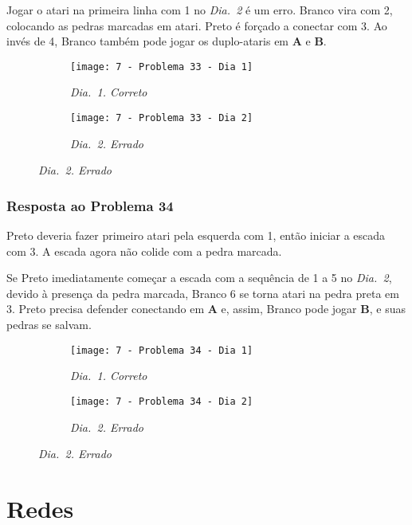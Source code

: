 Jogar o atari na primeira linha com 1 no \emph{Dia.\@~2} é um erro. Branco vira com 2, colocando as pedras marcadas em atari. Preto é forçado a conectar com 3. Ao invés de 4, Branco também pode jogar os duplo-ataris em \textbf{A} e \textbf{B}.

\begin{figure}[h!]
    \centering
    \begin{subfigure}[t]{.31\textwidth}
        \texttt{[image: 7 - Problema 33 - Dia 1]}
        \caption*{\emph{Dia.\@~1. Correto}}
    \end{subfigure}
    \hspace{1cm}
    \begin{subfigure}[t]{.31\textwidth}
        \texttt{[image: 7 - Problema 33 - Dia 2]}
        \caption*{\emph{Dia.\@~2. Errado}}
    \end{subfigure}
\end{figure}

\subsubsection*{Resposta ao Problema 34}

Preto deveria fazer primeiro atari pela esquerda com 1, então iniciar a escada com 3. A escada agora não colide com a pedra marcada.
        
Se Preto imediatamente começar a escada com a sequência de 1 a 5 no \emph{Dia.\@~2}, devido à presença da pedra marcada, Branco 6 se torna atari na pedra preta em 3. Preto precisa defender conectando em \textbf{A} e, assim, Branco pode jogar \textbf{B}, e suas pedras se salvam.

\begin{figure}[h!]
    \centering
    \begin{subfigure}[t]{.31\textwidth}
        \texttt{[image: 7 - Problema 34 - Dia 1]}
        \caption*{\emph{Dia.\@~1. Correto}}
    \end{subfigure}
    \hspace{1cm}
    \begin{subfigure}[t]{.31\textwidth}
        \texttt{[image: 7 - Problema 34 - Dia 2]}
        \caption*{\emph{Dia.\@~2. Errado}}
    \end{subfigure}
\end{figure}

\pagebreak

\section{Redes}

